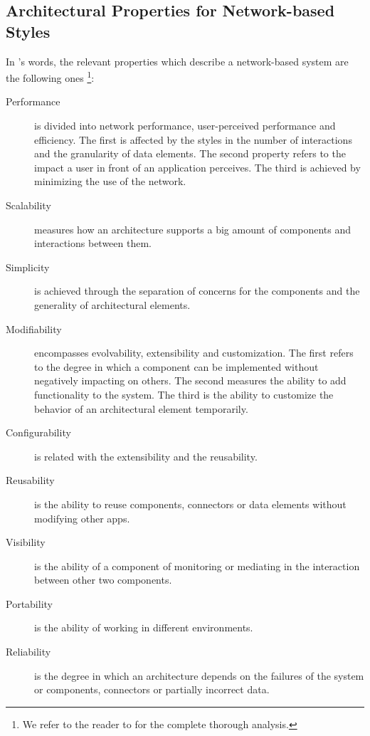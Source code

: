 




\subsection{Architectural Properties for Network-based Styles}
\label{sec:network_properties}




In \citeauthor{fielding_architectural_2000}'s words, the relevant properties which describe a network-based system are the following ones \footnote{We refer to the reader to \citet{fielding_architectural_2000} for the complete thorough analysis.}:
\begin{description}
  \item[Performance] is divided into network performance, user-perceived performance and efficiency.
		    The first is affected by the styles in the number of interactions and the granularity of data elements.
		    The second property refers to the impact a user in front of an application perceives.
		    The third is achieved by minimizing the use of the network.
  \item[Scalability] measures how an architecture supports a big amount of components and interactions between them.
  \item[Simplicity] is achieved through the separation of concerns for the components and the generality of architectural elements.
  \item[Modifiability] encompasses evolvability, extensibility and customization.
		      The first refers to the degree in which a component can be implemented without negatively impacting on others.
		      The second measures the ability to add functionality to the system.
		      The third is the ability to customize the behavior of an architectural element temporarily.
  \item[Configurability] is related with the extensibility and the reusability.
  \item[Reusability] is the ability to reuse components, connectors or data elements without modifying other apps.
  \item[Visibility] is the ability of a component of monitoring or mediating in the interaction between other two components.
  \item[Portability] is the ability of working in different environments.
  \item[Reliability] is the degree in which an architecture depends on the failures of the system or components, connectors or partially incorrect data.
\end{description}


